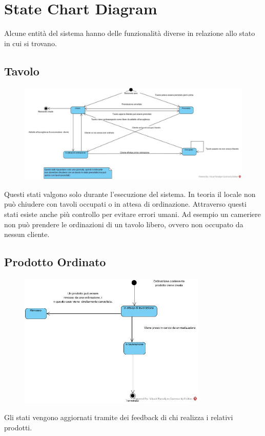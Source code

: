 \section{State Chart Diagram}
Alcune entità del sistema hanno delle funzionalità diverse in relazione allo stato in cui si trovano.

\subsection{Tavolo}
\vspace*{0.2cm}
\begin{figure}[H]
	\centering
	\includegraphics[width=1\textwidth]{Immagini/stati_tavolo.jpg}
\end{figure}
\vspace*{0.1cm}
Questi stati valgono solo durante l'esecuzione del sistema. In teoria il locale non può chiudere con tavoli occupati o in attesa di ordinazione. Attraverso questi stati esiste anche più controllo per evitare errori umani. Ad esempio un cameriere non può prendere le ordinazioni di un tavolo libero, ovvero non occupato da nessun cliente.

\subsection{Prodotto Ordinato}
\vspace*{0.2cm}
\begin{figure}[H]
	\centering
	\includegraphics[width=0.8\textwidth]{Immagini/stati_prodotti_ordinati.jpg}
\end{figure}
\vspace*{0.1cm}
Gli stati vengono aggiornati tramite dei feedback di chi realizza i relativi prodotti.

